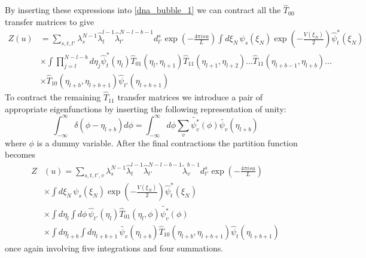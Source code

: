 %
By inserting these expressions into \eqref{dna_bubble_1} we can contract all the $\hat{T}_{00}$ transfer matrices to give
%
\begin{align}
\label{dna_bubble_2}
Z\left(u\right)&=\sum_{s,t,t'}\lambda_{s}^{N-1}\hat{\lambda}_{t}^{l-1}\hat{\lambda}_{t'}^{N-l-b-1}d^{s}_{t'}\exp\left(-\frac{4\pi isu}{L}\right)\int d\xi_{N}\,\psi_{s}\left(\xi_{N}\right)\exp\left(-\frac{V\left(\xi_{N}\right)}{2}\right)\hat{\psi}^{*}_{t}\left(\xi_{N}\right)\nonumber\\
&\times\int\prod_{j=l}^{N-l-b}d\eta_{j}\hat{\psi}^{*}_{t}\left(\eta_{l}\right)\hat{T}_{01}\left(\eta_{l},\eta_{l+1}\right)\hat{T}_{11}\left(\eta_{l+1},\eta_{l+2}\right)...\hat{T}_{11}\left(\eta_{l+b-1},\eta_{l+b}\right)...\nonumber\\
&\times\hat{T}_{10}\left(\eta_{l+b},\eta_{l+b+1}\right)\hat{\psi}_{t'}\left(\eta_{l+b+1}\right)
\end{align}
%
To contract the remaining $\hat{T}_{11}$ transfer matrices we introduce a pair of appropriate eigenfunctions by inserting the following representation of unity:
%
\begin{equation}
\int_{-\infty}^{\infty}\delta\left(\phi-\eta_{l+b}\right)d\phi=\int_{-\infty}^{\infty}d\phi\sum_{v}\tilde{\psi^{*}_{v}}\left(\phi\right)\tilde{\psi_{v}}\left(\eta_{l+b}\right)
\end{equation}
%
where $\phi$ is a dummy variable. After the final contractions the partition function becomes
%
\begin{align}
Z&\left(u\right)=\sum_{s,t,t',v}\lambda_{s}^{N-1}\hat{\lambda}_{t}^{l-1}\hat{\lambda}_{t'}^{N-l-b-1}\tilde{\lambda}_{v}^{b-1}d^{s}_{t'}\exp\left(-\frac{4\pi isu}{L}\right)\nonumber\\
&\times\int d\xi_{N}\,\psi_{s}\left(\xi_{N}\right)\exp\left(-\frac{V\left(\xi_{N}\right)}{2}\right)\hat{\psi}^{*}_{t}\left(\xi_{N}\right)\nonumber\\
&\times\int d\eta_{l}\int d\phi\,\hat{\psi}_{t'}\left(\eta_{l}\right)\hat{T}_{01}\left(\eta_{l},\phi\right)\tilde{\psi^{*}_{v}}\left(\phi\right)\nonumber\\
&\times\int d\eta_{l+b}\int d\eta_{l+b+1}\,\tilde{\psi_{v}}\left(\eta_{l+b}\right)\hat{T}_{10}\left(\eta_{l+b},\eta_{l+b+1}\right)\hat{\psi}_{t}\left(\eta_{l+b+1}\right)
\end{align}
%
once again involving five integrations and four summations.
%
